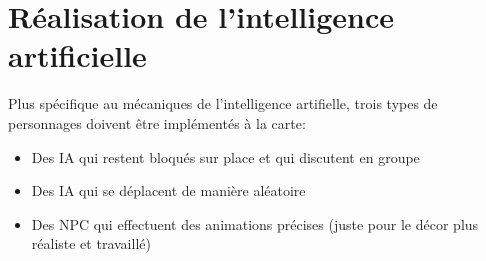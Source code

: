 \documentclass[../doc.tex]{subfiles}
\begin{document}
\section{Réalisation de l'intelligence artificielle}
Plus spécifique au mécaniques de l'intelligence artifielle,
 trois types de personnages doivent être implémentés à la carte:
\begin{itemize}
    \item Des IA qui restent bloqués sur place et qui discutent en groupe
    \item Des IA qui se déplacent de manière aléatoire
    \item Des NPC qui effectuent des animations précises
        (juste pour le décor plus réaliste et travaillé)
\end{itemize}
\end{document}
